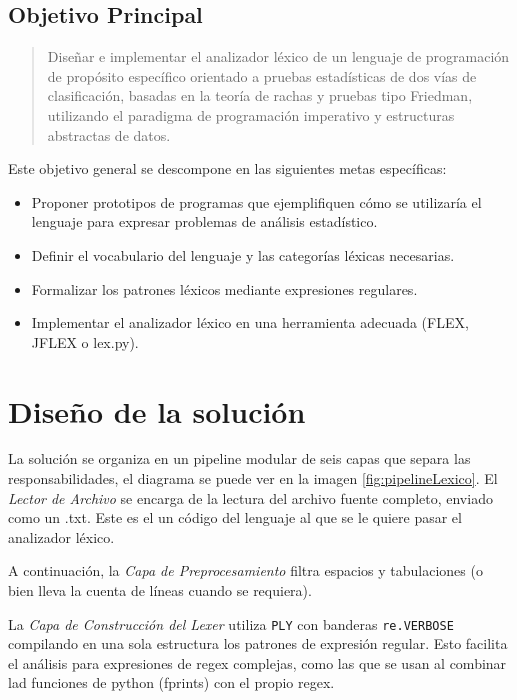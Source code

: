 \documentclass{article}
\begin{document}
\subsection{Objetivo Principal}

\begin{quote}
Diseñar e implementar el analizador léxico de un lenguaje de programación de propósito específico orientado a pruebas estadísticas de dos vías de clasificación, basadas en la teoría de rachas y pruebas tipo Friedman, utilizando el paradigma de programación imperativo y estructuras abstractas de datos.
\end{quote}

Este objetivo general se descompone en las siguientes metas específicas:

\begin{itemize}
  \item Proponer prototipos de programas que ejemplifiquen cómo se utilizaría el lenguaje para expresar problemas de análisis estadístico.
  \item Definir el vocabulario del lenguaje y las categorías léxicas necesarias.
  \item Formalizar los patrones léxicos mediante expresiones regulares.
  \item Implementar el analizador léxico en una herramienta adecuada (FLEX, JFLEX o lex.py).
\end{itemize}

\section{Diseño de la solución}\label{sec:dis}


La solución se organiza en un pipeline modular de seis capas que separa 
las responsabilidades, el diagrama se puede ver en la imagen \ref{fig:pipelineLexico}.
El \emph{Lector de Archivo} se encarga de la lectura 
del archivo fuente completo, enviado como un .txt. Este es el
un código del lenguaje al que se le quiere pasar el analizador léxico.

A continuación, la \emph{Capa de Preprocesamiento} filtra espacios y tabulaciones 
(o bien lleva la cuenta de líneas cuando se requiera).

La \emph{Capa de Construcción del Lexer} utiliza \texttt{PLY} con banderas 
\texttt{re.VERBOSE} compilando en una sola estructura los patrones de expresión 
regular. Esto facilita el análisis para expresiones de regex
complejas, como las que se usan al combinar
lad funciones de python (fprints) con el propio regex.
\end{document}
